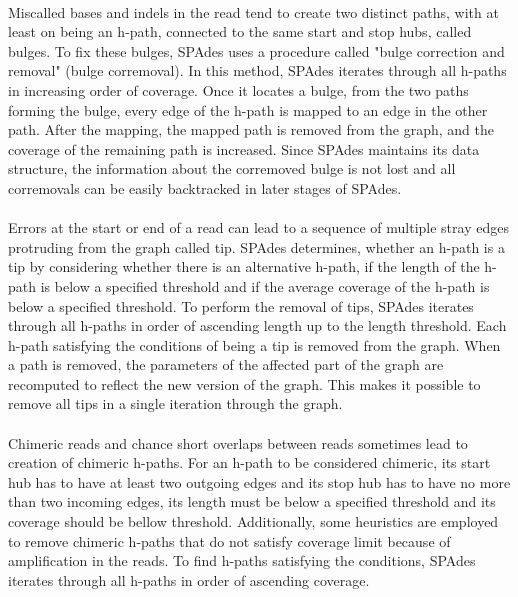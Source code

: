 \paragraph*{}
Miscalled bases and indels in the read tend to create two distinct paths, with at least on being an h-path, connected to the same start and stop hubs, called bulges. To fix these bulges, SPAdes uses a procedure called "bulge correction and removal" (bulge corremoval). In this method, SPAdes iterates through all h-paths in increasing order of coverage. Once it locates a bulge, from the two paths forming the bulge, every edge of the h-path is mapped to an edge in the other path. After the mapping, the mapped path is removed from the graph, and the coverage of the remaining path is increased. Since SPAdes maintains its data structure, the information about the corremoved bulge is not lost and all corremovals can be easily backtracked in later stages of SPAdes.
\paragraph*{}
Errors at the start or end of a read can lead to a sequence of multiple stray edges protruding from the graph called tip. SPAdes determines, whether an h-path is a tip by considering whether there is an alternative h-path, if the length of the h-path is below a specified threshold and if the average coverage of the h-path is below a specified threshold. To perform the removal of tips, SPAdes iterates through all h-paths in order of ascending length up to the length threshold. Each h-path satisfying the conditions of being a tip is removed from the graph. When a path is removed, the parameters of the affected part of the graph are recomputed to reflect the new version of the graph. This makes it possible to remove all tips in a single iteration through the graph.
\paragraph*{}
Chimeric reads and chance short overlaps between reads sometimes lead to creation of chimeric h-paths. For an h-path to be considered chimeric, its start hub has to have at least two outgoing edges and its stop hub has to have no more than two incoming edges, its length must be below a specified threshold and its coverage should be bellow threshold. Additionally, some heuristics are employed to remove chimeric h-paths that do not satisfy coverage limit because of amplification in the reads. To find h-paths satisfying the conditions, SPAdes iterates through all h-paths in order of ascending coverage.
